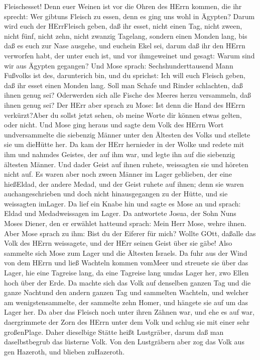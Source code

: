 Fleischesset! Denn euer Weinen ist vor die Ohren des HErrn kommen, die
ihr sprecht: Wer gibtuns Fleisch zu essen, denn es ging uns wohl in
Ägypten? Darum wird euch der HErrFleisch geben, daß ihr esset,
 nicht einen Tag, nicht zween, nicht fünf, nicht zehn,
nicht zwanzig Tagelang,  sondern einen Monden lang, bis daß
es euch zur Nase ausgehe, und euchein Ekel sei, darum daß ihr den HErrn
verworfen habt, der unter euch ist, und vor ihmgeweinet und gesagt:
Warum sind wir aus Ägypten gegangen?  Und Mose sprach:
Sechshunderttausend Mann Fußvolks ist des, darunterich bin, und du
sprichst: Ich will euch Fleisch geben, daß ihr esset einen Monden lang.
 Soll man Schafe und Rinder schlachten, daß ihnen genug
sei? Oderwerden sich alle Fische des Meeres herzu versammeln, daß ihnen
genug sei?  Der HErr aber sprach zu Mose: Ist denn die Hand
des HErrn verkürzt?Aber du sollst jetzt sehen, ob meine Worte dir können
etwas gelten, oder nicht.  Und Mose ging heraus und sagte
dem Volk des HErrn Wort undversammelte die siebenzig Männer unter den
Ältesten des Volks und stellete sie um dieHütte her.  Da
kam der HErr hernieder in der Wolke und redete mit ihm und nahmdes
Geistes, der auf ihm war, und legte ihn auf die siebenzig ältesten
Männer. Und dader Geist auf ihnen ruhete, weissagten sie und höreten
nicht auf.  Es waren aber noch zween Männer im Lager
geblieben, der eine hießEldad, der andere Medad, und der Geist ruhete
auf ihnen; denn sie waren auchangeschrieben und doch nicht
hinausgegangen zu der Hütte, und sie weissagten imLager. 
Da lief ein Knabe hin und sagte es Mose an und sprach: Eldad und
Medadweissagen im Lager.  Da antwortete Josua, der Sohn
Nuns Moses Diener, den er erwählet hatteund sprach: Mein Herr Mose,
wehre ihnen.  Aber Mose sprach zu ihm: Bist du der Eiferer
für mich? Wollte GOtt, daßalle das Volk des HErrn weissagete, und der
HErr seinen Geist über sie gäbe!  Also sammelte sich Mose
zum Lager und die Ältesten Israels.  Da fuhr aus der Wind
von dem HErrn und ließ Wachteln kommen vomMeer und streuete sie über das
Lager, hie eine Tagreise lang, da eine Tagreise lang umdas Lager her,
zwo Ellen hoch über der Erde.  Da machte sich das Volk auf
denselben ganzen Tag und die ganze Nachtund den andern ganzen Tag und
sammelten Wachteln, und welcher am wenigstensammelte, der sammelte zehn
Homer, und hängete sie auf um das Lager her.  Da aber das
Fleisch noch unter ihren Zähnen war, und ehe es auf war, daergrimmete
der Zorn des HErrn unter dem Volk und schlug sie mit einer sehr
großenPlage.  Daher dieselbige Stätte heißt Lustgräber,
darum daß man daselbstbegrub das lüsterne Volk.  Von den
Lustgräbern aber zog das Volk aus gen Hazeroth, und blieben zuHazeroth.

